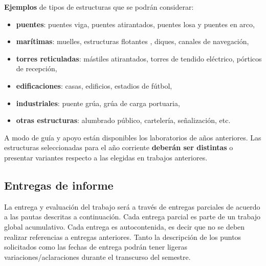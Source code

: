 \documentclass[a4paper,11pt,twocolumn]{article}
\begin{document}
\vspace{5mm}

\textbf{Ejemplos} de tipos de estructuras que se podrán considerar:
%
\begin{itemize}
	\item \textbf{puentes}: puentes viga, puentes atirantados, puentes losa y puentes en arco,
	\item \textbf{marítimas}: muelles, estructuras flotantes , diques, canales de navegación,	
	\item \textbf{torres reticuladas}: mástiles atirantados, torres de tendido eléctrico, pórticos de recepción,
	\item \textbf{edificaciones}: casas, edificios, estadios de fútbol,
	\item \textbf{industriales}: puente grúa, grúa de carga portuaria,
	\item \textbf{otras estructuras}: alumbrado público, cartelería, señalización, etc.
\end{itemize}

A modo de guía y apoyo están disponibles los laboratorios de años anteriores. Las estructuras seleccionadas para el año corriente \textbf{deberán ser distintas} o presentar variantes respecto a las elegidas en trabajos anteriores.	

\subsection{Entregas de informe}

La entrega y evaluación del trabajo será a través de entregas parciales de acuerdo a las pautas descritas a continuación. %
%
Cada entrega parcial es parte de un trabajo global acumulativo. Cada entrega es autocontenida, es decir que no se deben realizar referencias a entregas anteriores. %
%
Tanto la descripción de los puntos solicitados como las fechas de entrega podrán tener ligeras variaciones/aclaraciones durante el transcurso del semestre.
\end{document}
